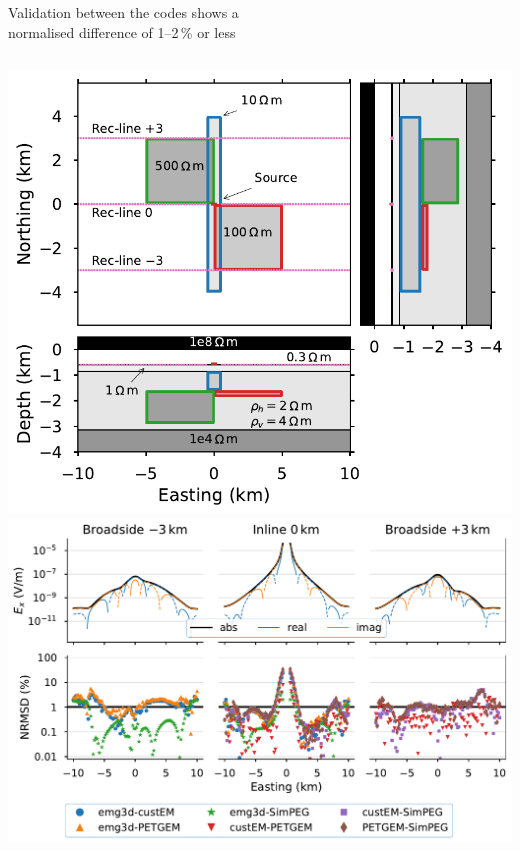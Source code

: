 \documentclass[xcolor=svgnames, aspectratio=169]{beamer}
\begin{document}
\begin{frame}[t]%
  {Validation between the codes shows a\\
   normalised difference of 1--2\,\% or less}
  \vspace{.5cm}
  \begin{columns}[c]
      \includegraphics[width=.9\textwidth, trim=0 0 123.5 0, clip]{model-block}
      \includegraphics[width=\textwidth]{results-block}
  \end{columns}
\end{frame}
\end{document}
